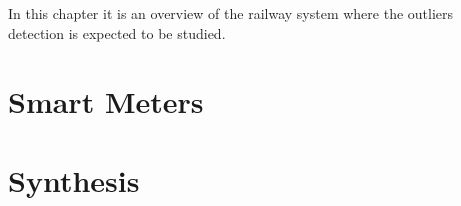 In this chapter it is an overview of the railway system where the outliers detection is expected to be studied.


\section{Smart Meters}



\section{Synthesis}